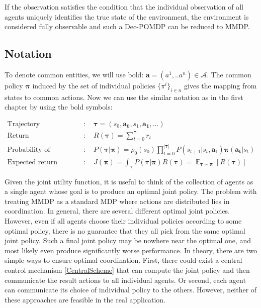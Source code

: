 If the observation satisfies the condition that the individual observation of all agents uniquely identifies the true state of the environment, the environment is considered fully observable and such a Dec-POMDP can be reduced to MMDP.
\subsection*{Notation}
To denote common entities, we will use bold:
$\boldsymbol{a}=(a^1,..a^n) \in \mathcal{A}$.
The common policy $\boldsymbol{\pi}$ induced by the set of individual policies ${\{\pi^i\}}_{i \in n}$ gives the mapping from states to common actions.
Now we can use the similar notation as in the first chapter by using the bold symbols:

\begin{align*}    
        \textrm{Trajectory}&: \quad \boldsymbol{\tau} = (s_0, \boldsymbol{a_0}, s_1, \boldsymbol{a_1}, ...) \\
        \textrm{Return}&: \quad R(\boldsymbol{\tau}) = \sum_{t=0}^{\boldsymbol{\tau}}r_t  \\
        \textrm{Probability of trajectory}&: \quad P(\boldsymbol{\tau}|\boldsymbol{\pi}) = \rho_0(s_0) \prod_{t=0}^{|\boldsymbol{\tau}|} P(s_{t+1}|s_t,\boldsymbol{a_t})\boldsymbol{\pi}(\boldsymbol{a_t}|s_t) \\
        \textrm{Expected return}&: \quad J(\boldsymbol{\pi})=\int_{\boldsymbol{\tau}} P(\boldsymbol{\tau}|\boldsymbol{\pi})R(\boldsymbol{\tau})= \mathop{\mathbb{E}}_{\boldsymbol{\tau} \sim \boldsymbol{\pi}}[R(\boldsymbol{\tau})]
\end{align*}


Given the joint utility function, it is useful to think of the collection of agents as a single agent whose goal is to produce an optimal joint policy.
The problem with treating MMDP as a standard MDP where actions are distributed lies in coordination.
In general, there are several different optimal joint policies.
However, even if all agents choose their individual policies according to some optimal policy, there is no guarantee that they all pick from the same optimal joint policy.
Such a final joint policy may be nowhere near the optimal one, and most likely even produce significantly worse performance.
In theory, there are two simple ways to ensure optimal coordination.
First, there could exist a central control mechanism \ref{CentralScheme} that can compute the joint policy and then communicate the result actions to all individual agents.
Or second, each agent can communicate its choice of individual policy to the others.
However, neither of these approaches are feasible in the real application.

